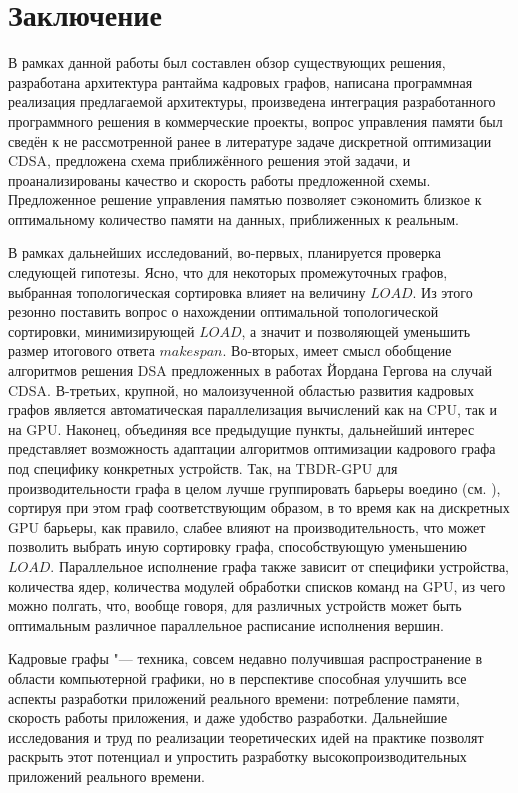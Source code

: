 \section{Заключение}
В рамках данной работы был составлен обзор существующих решения, разработана архитектура рантайма кадровых графов, написана программная реализация предлагаемой архитектуры, произведена интеграция разработанного программного решения в коммерческие проекты, вопрос управления памяти был сведён к не рассмотренной ранее в литературе задаче дискретной оптимизации CDSA, предложена схема приближённого решения этой задачи, и проанализированы качество и скорость работы предложенной схемы.
Предложенное решение управления памятью позволяет сэкономить близкое к оптимальному количество памяти на данных, приближенных к реальным.

В рамках дальнейших исследований, во-первых, планируется проверка следующей гипотезы.
Ясно, что для некоторых промежуточных графов, выбранная топологическая сортировка влияет на величину $LOAD$.
Из этого резонно поставить вопрос о нахождении оптимальной топологической сортировки, минимизирующей $LOAD$, а значит и позволяющей уменьшить размер итогового ответа $makespan$.
Во-вторых, имеет смысл обобщение алгоритмов решения DSA предложенных в работах Йордана Гергова \cite{gergov_approximation_1996, gergov_algorithms_1999} на случай CDSA.
В-третьих, крупной, но малоизученной областью развития кадровых графов является автоматическая параллелизация вычислений как на CPU, так и на GPU.
Наконец, объединяя все предыдущие пункты, дальнейший интерес представляет возможность адаптации алгоритмов оптимизации кадрового графа под специфику конкретных устройств. Так, на TBDR-GPU для производительности графа в целом лучше группировать барьеры воедино (см. \cite{GraniteBlogPost}), сортируя при этом граф соответствующим образом, в то время как на дискретных GPU барьеры, как правило, слабее влияют на производительность, что может позволить выбрать иную сортировку графа, способствующую уменьшению $LOAD$. Параллельное исполнение графа также зависит от специфики устройства, количества ядер, количества модулей обработки списков команд на GPU, из чего можно полгать, что, вообще говоря, для различных устройств может быть оптимальным различное параллельное расписание исполнения вершин.

Кадровые графы "--- техника, совсем недавно получившая распространение в области компьютерной графики, но в перспективе способная улучшить все аспекты разработки приложений реального времени: потребление памяти, скорость работы приложения, и даже удобство разработки. Дальнейшие исследования и труд по реализации теоретических идей на практике позволят раскрыть этот потенциал и упростить разработку высокопроизводительных приложений реального времени.
